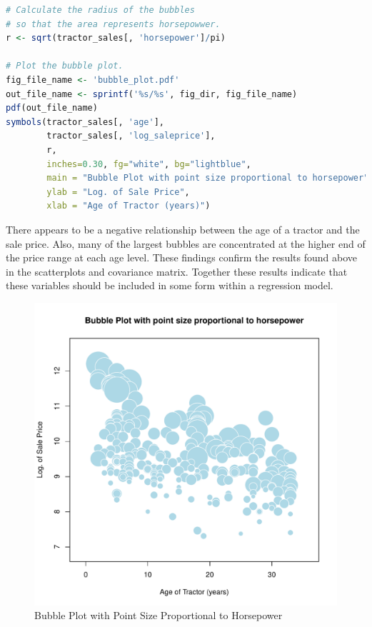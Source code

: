 \begin{lstlisting}[language=R]
# Calculate the radius of the bubbles
# so that the area represents horsepowwer.
r <- sqrt(tractor_sales[, 'horsepower']/pi)

# Plot the bubble plot.
fig_file_name <- 'bubble_plot.pdf'
out_file_name <- sprintf('%s/%s', fig_dir, fig_file_name)
pdf(out_file_name)
symbols(tractor_sales[, 'age'],
        tractor_sales[, 'log_saleprice'],
        r,
        inches=0.30, fg="white", bg="lightblue",
        main = "Bubble Plot with point size proportional to horsepower",
        ylab = "Log. of Sale Price",
        xlab = "Age of Tractor (years)")
\end{lstlisting}


\pagebreak

There appears to be a negative relationship between
the age of a tractor and the sale price.
Also, many of the largest bubbles are concentrated at the higher end of
the price range at each age level.
These findings confirm the results found above in the scatterplots
and covariance matrix.
Together these results indicate that these variables should be included
in some form within a regression model.

\begin{figure}[h!]
  \centering
  \includegraphics[scale = 0.5, keepaspectratio=true]{../Figures/bubble_plot}
  \caption{Bubble Plot with Point Size Proportional to Horsepower} \label{fig:bubble_plot}
\end{figure}




% 
